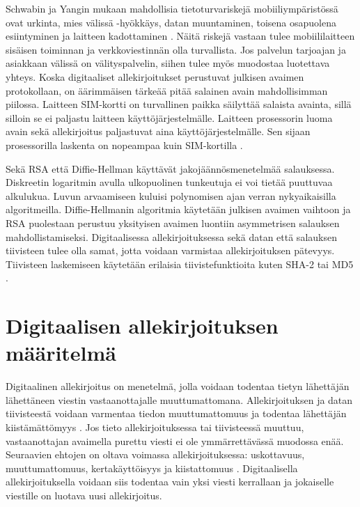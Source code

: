 \documentclass[finnish]{tktltiki2}
\theoremstyle{definition}
\theoremstyle{remark}
\begin{document}
Schwabin ja Yangin mukaan mahdollisia tietoturvariskejä mobiiliympäristössä ovat urkinta, mies välissä -hyökkäys, datan muuntaminen, toisena osapuolena esiintyminen ja laitteen kadottaminen \cite{enti}. Näitä riskejä vastaan tulee mobiililaitteen sisäisen toiminnan ja verkkoviestinnän olla turvallista. Jos palvelun tarjoajan ja asiakkaan välissä on välityspalvelin, siihen tulee myös muodostaa luotettava yhteys.
Koska digitaaliset allekirjoitukset perustuvat julkisen avaimen protokollaan, on äärimmäisen tärkeää pitää salainen avain mahdollisimman piilossa. Laitteen SIM-kortti on turvallinen paikka säilyttää salaista avainta, sillä silloin se ei paljastu laitteen käyttöjärjestelmälle. Laitteen prosessorin luoma avain sekä allekirjoitus paljastuvat aina käyttöjärjestelmälle. Sen sijaan prosessorilla laskenta on nopeampaa kuin SIM-kortilla \cite{proxy}. 

Sekä RSA että Diffie-Hellman käyttävät jakojäännösmenetelmää salauksessa.
Diskreetin logaritmin avulla ulkopuolinen tunkeutuja ei voi tietää puuttuvaa alkulukua. Luvun arvaamiseen kuluisi polynomisen ajan verran nykyaikaisilla algoritmeilla. Diffie-Hellmanin algoritmia käytetään julkisen avaimen vaihtoon ja RSA puolestaan perustuu yksityisen avaimen luontiin asymmetrisen salauksen mahdollistamiseksi. Digitaalisessa allekirjoituksessa sekä datan että salauksen tiivisteen tulee olla samat, jotta voidaan varmistaa allekirjoituksen pätevyys. Tiivisteen laskemiseen käytetään erilaisia tiivistefunktioita kuten SHA-2 tai MD5 \cite{gene}.



   
      


\section{Digitaalisen allekirjoituksen määritelmä}

Digitaalinen allekirjoitus on menetelmä, jolla voidaan todentaa tietyn lähettäjän lähettäneen viestin vastaanottajalle muuttumattomana. Allekirjoituksen ja datan tiivisteestä voidaan varmentaa tiedon muuttumattomuus ja todentaa lähettäjän kiistämättömyys \cite{moen}. Jos tieto allekirjoituksessa tai tiivisteessä muuttuu, vastaanottajan avaimella purettu viesti ei ole ymmärrettävässä muodossa enää. Seuraavien ehtojen on oltava voimassa allekirjoituksessa: uskottavuus, muuttumattomuus, kertakäyttöisyys ja kiistattomuus \cite{e-c}. Digitaalisella allekirjoituksella voidaan siis todentaa vain yksi viesti kerrallaan ja jokaiselle viestille on luotava uusi allekirjoitus. 
\end{document}
